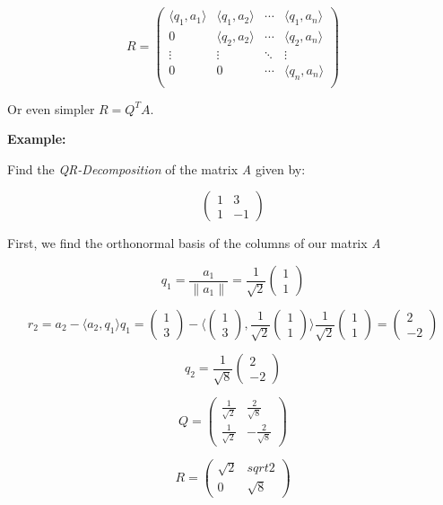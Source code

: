 \[
    R =
    \begin{pmatrix}
        \langle q_1, a_1 \rangle & \langle q_1, a_2 \rangle & \cdots &\langle q_1, a_n\rangle \\ 
        0 & \langle q_2, a_2 \rangle & \cdots & \langle q_2, a_n\rangle \\ 
        \vdots & \vdots  & \ddots & \vdots \\
        0 & 0  & \cdots & \langle q_n, a_n \rangle \\ 
    \end{pmatrix}
\]

Or even simpler \(R = Q^T A\).
\vspace{\baselineskip}

\textbf{Example:}
\vspace{\baselineskip}

Find the \emph{QR-Decomposition} of the matrix \emph{A} given by:

\[
    \begin{pmatrix}
        1 & 3 \\
        1 & -1 
    \end{pmatrix}
\]

First, we find the orthonormal basis of the columns of our matrix \emph{A} 

\[ 
    q_1 = \frac{a_1}{\|a_1\|} = \frac{1}{\sqrt{2}} \begin{pmatrix} 1 \\ 1 \end{pmatrix}
\]

\[ 
    r_2 = a_2 - \langle a_2, q_1\rangle q_1 
    = 
    \begin{pmatrix} 1 \\ 3 \end{pmatrix}
    - 
    \langle  
    \begin{pmatrix} 1 \\ 3 \end{pmatrix}
    ,
    \frac{1}{\sqrt{2}} \begin{pmatrix} 1 \\ 1 \end{pmatrix}
    \rangle    
    \frac{1}{\sqrt{2}} 
    \begin{pmatrix} 1 \\ 1 \end{pmatrix}
    = 
    \begin{pmatrix}
        2 \\ -2 
    \end{pmatrix}
\]

\[
    q_2 =
    \frac{1}{\sqrt{8}}
    \begin{pmatrix}
        2 \\ -2 
    \end{pmatrix}
\]

\[
    Q = 
    \begin{pmatrix}
        \frac{1}{\sqrt{2}} & \frac{2}{\sqrt{8}} \\
        \frac{1}{\sqrt{2}} & -\frac{2}{\sqrt{8}}
    \end{pmatrix}
\]

\[
    R =
    \begin{pmatrix}
        \sqrt{2} & sqrt{2} \\
        0    &    \sqrt{8}
    \end{pmatrix}
\]





